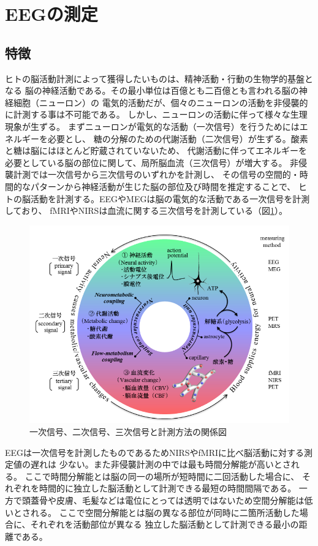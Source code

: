 \section{\mc EEGの測定}
\subsection{特徴}
ヒトの脳活動計測によって獲得したいものは、精神活動・行動の生物学的基盤となる
脳の神経活動である。その最小単位は百億とも二百億とも言われる脳の神経細胞（ニューロン）の
電気的活動だが、個々のニューロンの活動を非侵襲的に計測する事は不可能である。
しかし、ニューロンの活動に伴って様々な生理現象が生ずる。
まずニューロンが電気的な活動（一次信号）を行うためにはエネルギーを必要とし、
糖の分解のための代謝活動（二次信号）が生ずる。酸素と糖は脳にはほとんど貯蔵されていないため、
代謝活動に伴ってエネルギーを必要としている脳の部位に関して、局所脳血流（三次信号）が増大する。
非侵襲計測では一次信号から三次信号のいずれかを計測し、
その信号の空間的・時間的なパターンから神経活動が生じた脳の部位及び時間を推定することで、
ヒトの脳活動を計測する。EEGやMEGは脳の電気的な活動である一次信号を計測しており、
fMRIやNIRSは血流に関する三次信号を計測している（図\ref{fig:信号フロー}\cite{脳を測る}）。
\begin{figure}
    \centering
    \includegraphics[width=12cm]{images/signalflow.png}
    \caption{一次信号、二次信号、三次信号と計測方法の関係図\cite{脳を測る}}
    \label{fig:信号フロー}
\end{figure}

EEGは一次信号を計測したものであるためNIRSやfMRIに比べ脳活動に対する測定値の遅れは
少ない。また非侵襲計測の中では最も時間分解能が高いとされる。
ここで時間分解能とは脳の同一の場所が短時間に二回活動した場合に、
それぞれを時間的に独立した脳活動として計測できる最短の時間間隔である。
一方で頭蓋骨や皮膚、毛髪などは電位にとっては透明ではないため空間分解能は低いとされる。
ここで空間分解能とは脳の異なる部位が同時に二箇所活動した場合に、それぞれを活動部位が異なる
独立した脳活動として計測できる最小の距離である。

